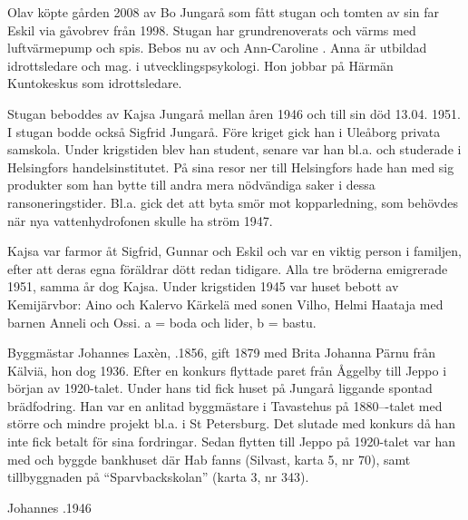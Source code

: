 %
Olav köpte gården 2008 av Bo Jungarå som fått stugan och tomten av sin far Eskil via gåvobrev från 1998. Stugan har grundrenoverats och värms med luftvärmepump och spis. Bebos nu av  och Ann-Caroline . Anna är utbildad idrottsledare och mag. i utvecklingspsykologi. Hon jobbar på Härmän Kuntokeskus som idrottsledare.



%
Stugan  beboddes av Kajsa Jungarå mellan åren 1946 och till sin död 13.04. 1951. I stugan bodde också Sigfrid Jungarå. Före kriget gick han i Uleåborg privata samskola. Under krigstiden blev han student, senare var han bl.a. och studerade i Helsingfors handelsinstitutet. På sina resor ner till Helsingfors hade han med sig produkter som han bytte till andra mera nödvändiga saker i dessa ransoneringstider. Bl.a. gick det att byta smör mot kopparledning, som behövdes när nya vattenhydrofonen skulle ha ström 1947.

Kajsa var farmor åt Sigfrid, Gunnar och Eskil och var en viktig person i familjen, efter att deras egna föräldrar dött redan tidigare. Alla tre bröderna emigrerade 1951, samma år dog Kajsa. Under krigstiden 1945 var huset bebott av Kemijärvbor: Aino och Kalervo Kärkelä med sonen Vilho, Helmi Haataja med barnen Anneli och Ossi. a = boda och lider, b = bastu.


%
Byggmästar Johannes Laxèn, .1856, gift 1879 med Brita Johanna Pärnu från Kälviä, hon dog 1936. Efter en konkurs flyttade paret från Åggelby till Jeppo i början av 1920-talet. Under hans tid fick huset på Jungarå liggande spontad brädfodring. Han var en anlitad byggmästare i Tavastehus på 1880---talet med större och mindre projekt bl.a. i St Petersburg. Det slutade med konkurs då han inte fick betalt för sina fordringar. Sedan flytten till Jeppo på 1920-talet var han med och byggde bankhuset där Hab fanns (Silvast, karta 5, nr 70), samt tillbyggnaden på ``Sparvbackskolan'' (karta 3, nr 343).

Johannes .1946


